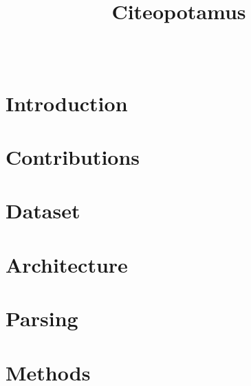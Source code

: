 \documentclass[10pt, conference, compsocconf]{IEEEtran}
\begin{document}
\title{Citeopotamus}


\author{
\\
}

\maketitle

\thispagestyle{empty}
\pagestyle{empty}

\section{Introduction}\label{sec:introduction}

\section{Contributions}\label{sec:contributions}


\section{Dataset}\label{sec:dataset}

\section{Architecture}\label{sec:architecture}

\section{Parsing}\label{sec:parsing}

\section{Methods}\label{sec:methods}
\end{document}
